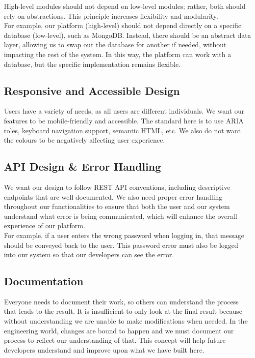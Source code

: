 \documentclass{article}
\begin{document}
High-level modules should not depend on low-level modules; rather, both should rely on abstractions. This principle increases flexibility and modularity. \\

\noindent For example, our platform (high-level) should not depend directly on a specific database (low-level), such as MongoDB. Instead, there should be an abstract data layer, allowing us to swap out the database for another if needed, without impacting the rest of the system. In this way, the platform can work with a database, but the specific implementation remains flexible.

\subsection*{Responsive and Accessible Design}

Users have a variety of needs, as all users are different individuals. We want our features to be mobile-friendly and accessible. The standard here is to use ARIA roles, keyboard navigation support, semantic HTML, etc. We also do not want the colours to be negatively affecting user experience.

\subsection*{API Design \& Error Handling}

We want our design to follow REST API conventions, including descriptive endpoints that are well documented. We also need proper error handling throughout our functionalities to ensure that both the user and our system understand what error is being communicated, which will enhance the overall experience of our platform. \\

\noindent For example, if a user enters the wrong password when logging in, that message should be conveyed back to the user. This password error must also be logged into our system so that our developers can see the error.

\subsection*{Documentation}

Everyone needs to document their work, so others can understand the process that leads to the result. It is insufficient to only look at the final result because without understanding we are unable to make modifications when needed. In the engineering world, changes are bound to happen and we must document our process to reflect our understanding of that. This concept will help future developers understand and improve upon what we have built here.
\end{document}
